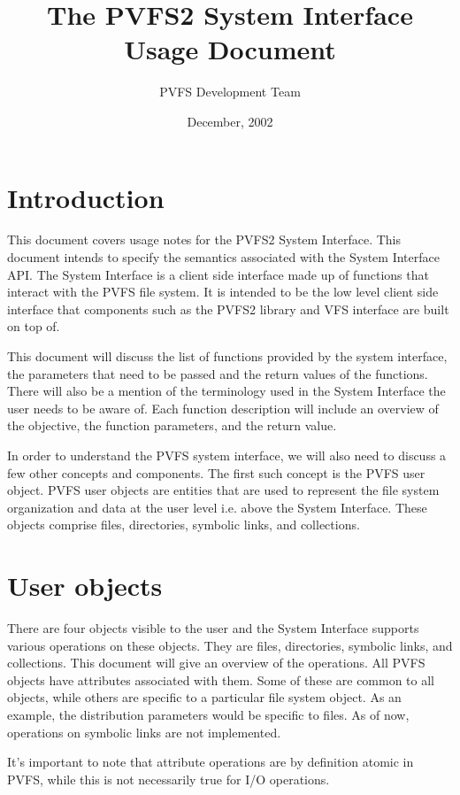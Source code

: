 \documentclass[11pt, letterpaper]{article}
\title{The PVFS2 System Interface Usage Document}
\author{ PVFS Development Team }
\date{ December, 2002 }
\begin{document}
\maketitle
\tableofcontents
\newpage

\section{Introduction}

This document covers usage notes for the PVFS2 System Interface.  This 
document intends to specify the semantics associated with the System
Interface API.  The System Interface is a client side interface made up
of functions that interact with the PVFS file system. It is intended to
be the low level client side interface that components such as the PVFS2
library and VFS interface are built on top of.

This document will discuss the list of functions provided by the system 
interface, the parameters that need to be passed and the return values
of the functions.  There will also be a mention of the terminology
used in the System Interface the user needs to be aware of.  Each function
description will include an overview of the objective, the function 
parameters, and the return value.

In order to understand the PVFS system interface, we will also need to
discuss a few other concepts and components.  The first such concept is
the PVFS user object.   PVFS user objects are entities that are used to
represent the file system organization and data at the user level i.e.
above the System Interface. These objects comprise files, directories,
symbolic links, and collections.  

\section{User objects}

There are four objects visible to the user and the System Interface supports
various operations on these objects. They are files, directories, symbolic
links, and collections. This document will give an overview of the operations. All PVFS objects have
attributes associated with them.  Some of these are common to all objects,
while others are specific to a particular file system object. As an example,
the distribution parameters would be specific to files. As of now,
operations on symbolic links are not implemented.

It's important to note that attribute operations are by definition
atomic in PVFS, while this is not necessarily true for I/O operations.
\end{document}
